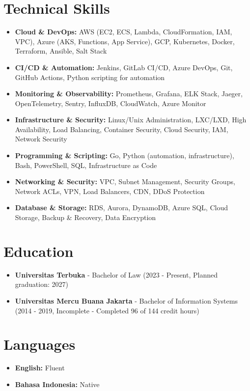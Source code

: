 \documentclass[11pt,a4paper]{article}
\newcommand{\skill}[1]{\textbf{#1}}
\begin{document}
\section{Technical Skills}
\begin{itemize}[leftmargin=*, itemsep=4pt]
    \item \skill{Cloud \& DevOps:} AWS (EC2, ECS, Lambda, CloudFormation, IAM, VPC), Azure (AKS, Functions, App Service), GCP, Kubernetes, Docker, Terraform, Ansible, Salt Stack
    \item \skill{CI/CD \& Automation:} Jenkins, GitLab CI/CD, Azure DevOps, Git, GitHub Actions, Python scripting for automation
    \item \skill{Monitoring \& Observability:} Prometheus, Grafana, ELK Stack, Jaeger, OpenTelemetry, Sentry, InfluxDB, CloudWatch, Azure Monitor
    \item \skill{Infrastructure \& Security:} Linux/Unix Administration, LXC/LXD, High Availability, Load Balancing, Container Security, Cloud Security, IAM, Network Security
    \item \skill{Programming \& Scripting:} Go, Python (automation, infrastructure), Bash, PowerShell, SQL, Infrastructure as Code
    \item \skill{Networking \& Security:} VPC, Subnet Management, Security Groups, Network ACLs, VPN, Load Balancers, CDN, DDoS Protection
    \item \skill{Database \& Storage:} RDS, Aurora, DynamoDB, Azure SQL, Cloud Storage, Backup \& Recovery, Data Encryption
\end{itemize}

\section{Education}
\begin{itemize}[leftmargin=*, itemsep=2pt]
    \item \textbf{Universitas Terbuka} - Bachelor of Law (2023 - Present, Planned graduation: 2027)
    \item \textbf{Universitas Mercu Buana Jakarta} - Bachelor of Information Systems (2014 - 2019, Incomplete - Completed 96 of 144 credit hours)
\end{itemize}

\section{Languages}
\begin{itemize}[leftmargin=*, itemsep=2pt]
    \item \textbf{English:} Fluent
    \item \textbf{Bahasa Indonesia:} Native
\end{itemize}
\end{document}
